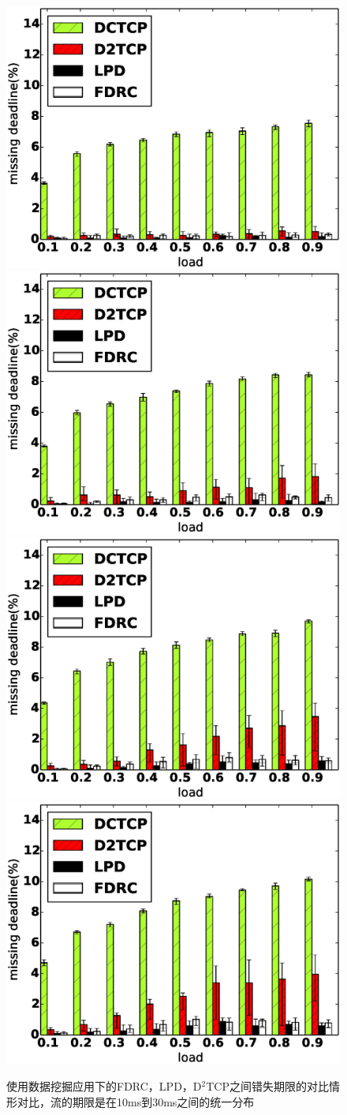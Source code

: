 \begin{figure}[h]
\setlength{\abovecaptionskip}{0pt} 
\setlength{\belowcaptionskip}{1pt} 
  \centering%
    {\includegraphics[width=0.5\columnwidth]{figures/FDRC/evaluation/spineleaf/miss_deadline_4.eps}}%
      {\includegraphics[width=0.5\columnwidth]{figures/FDRC/evaluation/spineleaf/miss_deadline_6.eps}}
    {\includegraphics[width=0.5\columnwidth]{figures/FDRC/evaluation/spineleaf/miss_deadline_8.eps}}%
      {\includegraphics[width=0.5\columnwidth]{figures/FDRC/evaluation/spineleaf/miss_deadline_9.eps}}
  \caption{使用数据挖掘应用下的FDRC，LPD，D$^2$TCP之间错失期限的对比情形对比，流的期限是在10ms到30ms之间的统一分布}
  \label{fdrc-miss-spine-data-fig}
\end{figure}


